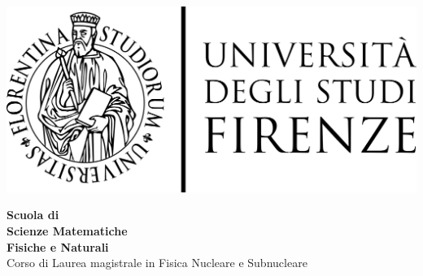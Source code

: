 
\begin{titlepage}
  \begin{center}
    \begin{minipage}{\textwidth}
      \noindent\begin{minipage}{0.4\textwidth}%
      \includegraphics[width=1.\textwidth]{Immagini/logo}%
    \end{minipage}%
    \hfill
    \noindent\begin{minipage}{0.4\textwidth}
      \begin{flushright}
      {\bf
        Scuola di \\
        Scienze Matematiche \\ 
        Fisiche e Naturali \\
      }
      Corso di Laurea magistrale in Fisica Nucleare e Subnucleare\\
      

\end{flushright}
\end{minipage}
\end{minipage}
\end{center}
\end{titlepage}
